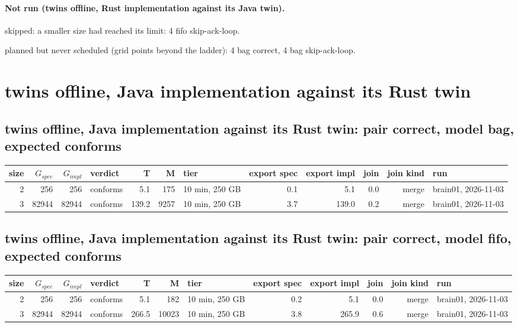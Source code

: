 \documentclass[10pt]{article}
\begin{document}
\paragraph{Not run (twins offline, Rust implementation against its Java twin).}
skipped: a smaller size had reached its limit: 4 fifo skip-ack-loop.\par
planned but never scheduled (grid points beyond the ladder): 4 bag correct, 4 bag skip-ack-loop.\par
\section*{twins offline, Java implementation against its Rust twin}
\subsection*{twins offline, Java implementation against its Rust twin: pair \textsf{correct}, model bag, expected conforms}
\begin{longtable}{@{}rrrlrrlrrrrl@{}}
\toprule
size & $G_{\mathit{spec}}$ & $G_{\mathit{impl}}$ & verdict & T & M & tier & export spec & export impl & join & join kind & run \\
\midrule
\endhead
\color{blue} 2 & 256 & 256 & conforms & 5.1 & 175 & 10 min, 250 GB & 0.1 & 5.1 & 0.0 & merge & brain01, 2026-11-03 \\
\color{blue} 3 & 82944 & 82944 & conforms & 139.2 & 9257 & 10 min, 250 GB & 3.7 & 139.0 & 0.2 & merge & brain01, 2026-11-03 \\
\bottomrule
\end{longtable}
\subsection*{twins offline, Java implementation against its Rust twin: pair \textsf{correct}, model fifo, expected conforms}
\begin{longtable}{@{}rrrlrrlrrrrl@{}}
\toprule
size & $G_{\mathit{spec}}$ & $G_{\mathit{impl}}$ & verdict & T & M & tier & export spec & export impl & join & join kind & run \\
\midrule
\endhead
\color{blue} 2 & 256 & 256 & conforms & 5.1 & 182 & 10 min, 250 GB & 0.2 & 5.1 & 0.0 & merge & brain01, 2026-11-03 \\
\color{blue} 3 & 82944 & 82944 & conforms & 266.5 & 10023 & 10 min, 250 GB & 3.8 & 265.9 & 0.6 & merge & brain01, 2026-11-03 \\
\bottomrule
\end{longtable}
\end{document}
